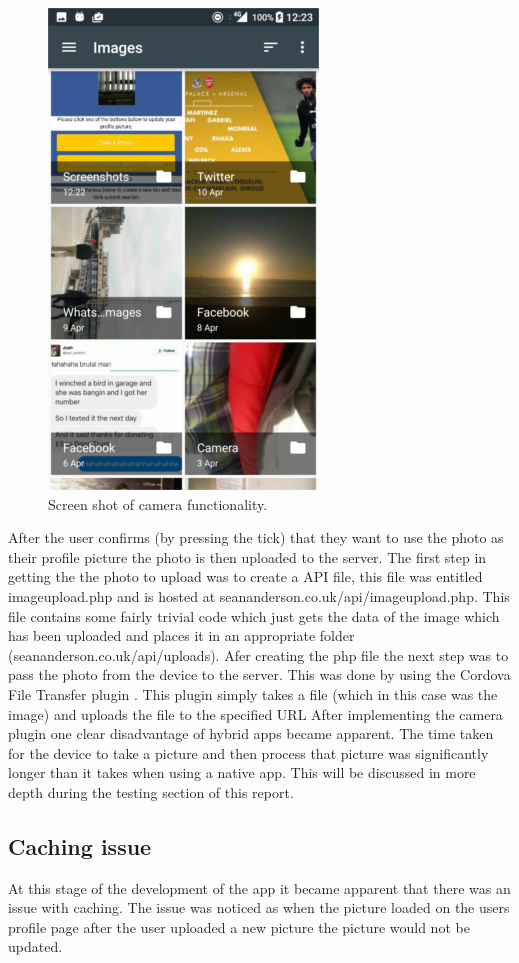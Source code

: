 \begin{figure}[H]
\includegraphics[scale=0.5]{images/sc9}
\caption{Screen shot of camera functionality.}
\end{figure}

After the user confirms (by pressing the tick) that they want to use the photo as their profile picture the photo is then uploaded to the server. The first step in getting the  the photo to upload was to create a API file, this file was entitled imageupload.php and is hosted at seananderson.co.uk/api/imageupload.php. This file contains some fairly trivial code which just gets the data of the image which has been uploaded and places it in an appropriate folder (seananderson.co.uk/api/uploads). Afer creating the php file the next step was to pass the photo from the device to the server. This was done by using the Cordova File Transfer plugin \cite{ft}. This plugin simply takes a file (which in this case was the image) and uploads the file to the specified URL
After implementing the camera plugin one clear disadvantage of hybrid apps became apparent. The time taken for the device to take a picture and then process that picture was significantly longer than it takes when using a native app. This will be discussed in more depth during the testing section of this report. 

\subsection{Caching issue}
At this stage of the development of the app it became apparent that there was an issue with caching. The issue was noticed as when the picture loaded on the users profile page after the user uploaded a new picture the picture would not be updated. 

